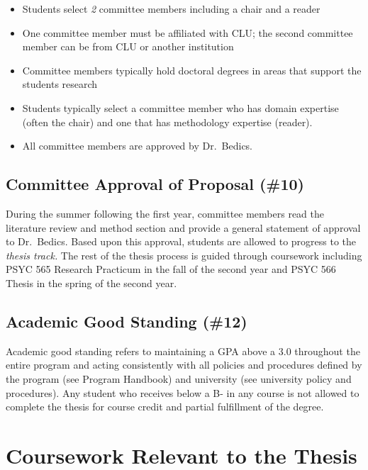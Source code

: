 \documentclass[]{book}
\providecommand{\tightlist}{%
  \setlength{\itemsep}{0pt}\setlength{\parskip}{0pt}}
\begin{document}
\begin{itemize}
\tightlist
\item
  Students select \emph{2} committee members including a chair and a reader
\item
  One committee member must be affiliated with CLU; the second committee member can be from CLU or another institution
\item
  Committee members typically hold doctoral degrees in areas that support the students research
\item
  Students typically select a committee member who has domain expertise (often the chair) and one that has methodology expertise (reader).\\
\item
  All committee members are approved by Dr.~Bedics.
\end{itemize}

\hypertarget{committee-approval-of-proposal-10}{%
\section{Committee Approval of Proposal (\#10)}\label{committee-approval-of-proposal-10}}

During the summer following the first year, committee members read the literature review and method section and provide a general statement of approval to Dr.~Bedics. Based upon this approval, students are allowed to progress to the \emph{thesis track.} The rest of the thesis process is guided through coursework including PSYC 565 Research Practicum in the fall of the second year and PSYC 566 Thesis in the spring of the second year.

\hypertarget{academic-good-standing-12}{%
\section{Academic Good Standing (\#12)}\label{academic-good-standing-12}}

Academic good standing refers to maintaining a GPA above a 3.0 throughout the entire program and acting consistently with all policies and procedures defined by the program (see Program Handbook) and university (see university policy and procedures). Any student who receives below a B- in any course is not allowed to complete the thesis for course credit and partial fulfillment of the degree.

\hypertarget{coursework-relevant-to-the-thesis}{%
\chapter{Coursework Relevant to the Thesis}\label{coursework-relevant-to-the-thesis}}
\end{document}
